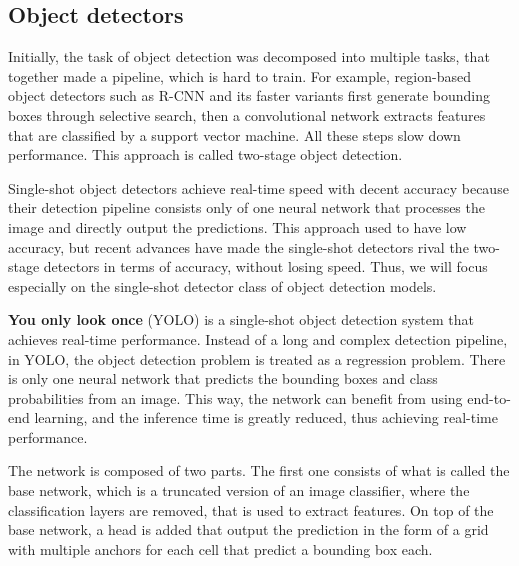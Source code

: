     \subsection{Object detectors}
        Initially, the task of object detection was decomposed into multiple tasks, that together made a pipeline, which is hard to train. For example, region-based object detectors such as R-CNN \cite{rcnn} and its faster variants first generate bounding boxes through selective search, then a convolutional network extracts features that are classified by a support vector machine. All these steps slow down performance. This approach is called two-stage object detection.
        
        Single-shot object detectors achieve real-time speed with decent accuracy \cite{ssd, yolo} because their detection pipeline consists only of one neural network that processes the image and directly output the predictions. This approach used to have low accuracy, but recent advances have made the single-shot detectors rival the two-stage detectors in terms of accuracy, without losing speed. Thus, we will focus especially on the single-shot detector class of object detection models.
        
        \textbf{You only look once} (YOLO) \cite{yolo} is a single-shot object detection system that achieves real-time performance. Instead of a long and complex detection pipeline, in YOLO, the object detection problem is treated as a regression problem. There is only one neural network that predicts the bounding boxes and class probabilities from an image. This way, the network can benefit from using end-to-end learning, and the inference time is greatly reduced, thus achieving real-time performance.
        
          The network is composed of two parts. The first one consists of what is called the base network, which is a truncated version of an image classifier, where the classification layers are removed, that is used to extract features. On top of the base network, a head is added that output the prediction in the form of a grid with multiple anchors for each cell that predict a bounding box each. 
          
          
